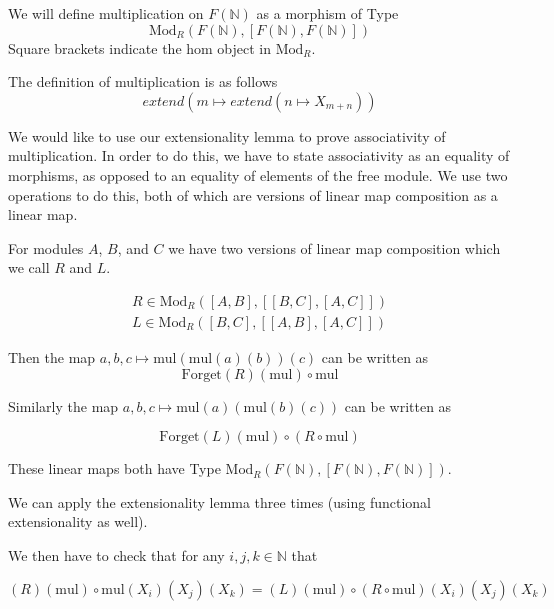 \documentclass[12pt]{article} %
\theoremstyle{definition}
\theoremstyle{definition}
\theoremstyle{definition}
\theoremstyle{definition}
\begin{document}
We will define multiplication on $F(\mathbb{N})$ as a morphism of Type 
\begin{equation}
  \text{Mod}_R(F(\mathbb{N}), [F(\mathbb{N}), F(\mathbb{N})])
\end{equation} 
Square brackets indicate the hom object in $\text{Mod}_R$.

The definition of multiplication is as follows
\begin{equation}
  extend (m \mapsto extend (n \mapsto X_{m + n}))
\end{equation}

We would like to use our extensionality lemma to prove associativity of multiplication.
In order to do this, we have to state associativity as an equality of morphisms,
as opposed to an equality of elements of the free module. We use two operations
to do this, both of which are versions of linear map composition as a linear map.

For modules $A$, $B$, and $C$ we have two versions of linear map 
composition which we call $R$ and $L$.

\begin{equation}
  \begin{aligned}
    R \in \text{Mod}_R([A, B], [[B,C],[A,C]]) \\
     L \in \text{Mod}_R([B, C], [[A,B],[A,C]])
  \end{aligned}
\end{equation}

Then the map $a, b, c \mapsto \text{mul} (\text{mul} (a)(b))(c)$ can be written as 
\begin{equation}
  \text{Forget}(R)(\text{mul}) \circ \text{mul}
\end{equation}

Similarly the map $a, b, c \mapsto \text{mul} (a)(\text{mul} (b)(c))$ can be written as

\begin{equation}
  \text{Forget}(L) (\text{mul}) \circ (R \circ \text{mul})
\end{equation}

These linear maps both have Type $\text{Mod}_R(F(\mathbb{N}), [F(\mathbb{N}), F(\mathbb{N})])$.

We can apply the extensionality lemma three times (using functional extensionality as well).

We then have to check that for any $i, j, k \in \mathbb{N}$ that

\begin{equation}
  (R)(\text{mul}) \circ \text{mul}(X_i)(X_j)(X_k) = (L) (\text{mul}) \circ (R \circ \text{mul})(X_i)(X_j)(X_k)
\end{equation}
\end{document}
